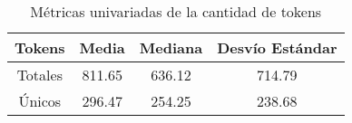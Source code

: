 \begin{table}[h!]
\begin{center}
\begin{tabular}{ |c|c|c|c| }
\hline
Tokens & Media & Mediana & Desvío Estándar \\
\hline\hline
Totales & 811.65 & 636.12 & 714.79 \\
\hline
Únicos & 296.47 & 254.25 & 238.68 \\
\hline
\end{tabular}
\caption{M\'etricas univariadas de la cantidad de tokens}
\label{table-tokens}
\end{center}
\end{table}
